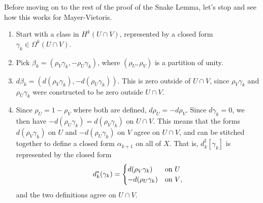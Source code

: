 \documentclass[12pt]{amsbook}
\theoremstyle{definition}
\begin{document}
Before moving on to the rest of the proof of the Snake Lemma, let's stop and
see how this works for Mayer-Vietoris. 
\begin{enumerate}
\item Start with a class in $H^k(U \cap V)$, represented by a closed
form $\gamma_k\in\Omega^k(U\cap V)$. 
\item Pick $\beta_k=(\rho_V \gamma_k, -\rho_U\gamma_k)$, where $(\rho_U,\rho_V)$
is a partition of unity. 
\item $d\beta_k= (d(\rho_V \gamma_k), -d(\rho_U\gamma_k))$. This is zero outside
of $U \cap V$, since $\rho_V\gamma_k$ and $\rho_U\gamma_k$ were constructed to
be zero outside $U\cap V$. 
\item Since $\rho_U=1-\rho_V$ where both are defined, 
$d\rho_U = - d\rho_V$. Since $d\gamma_k=0$, we then have $-d(\rho_U\gamma_k)=d(\rho_V\gamma_k)$ on $U \cap V$. This means that the forms $d(\rho_V\gamma_k)$ on $U$ and 
$-d(\rho_U\gamma_k)$ on $V$ agree on $U\cap V$, and can be stitched together
to define a closed form $\alpha_{k+1}$ on all of $X$. That is, $d_k^\sharp[\gamma_k]$ is represented by the closed form
$$ d_k^*(\gamma_k) = \begin{cases} d(\rho_V \gamma_k) & \hbox{on $U$} \cr 
-d(\rho_U \gamma_k) & \hbox{on $V$,} \end{cases} $$
and the two definitions agree on $U \cap V$. 
\end{enumerate}
\end{document}
